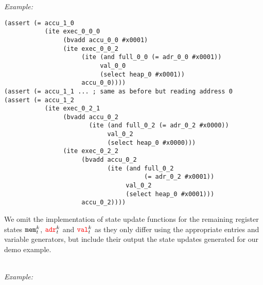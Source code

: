 \noindent
\emph{Example:} 

\begin{lstlisting}[style=smtlib]
(assert (= accu_1_0
           (ite exec_0_0_0
                (bvadd accu_0_0 #x0001)
                (ite exec_0_0_2
                     (ite (and full_0_0 (= adr_0_0 #x0001))
                          val_0_0
                          (select heap_0 #x0001))
                     accu_0_0))))
(assert (= accu_1_1 ... ; same as before but reading address 0
(assert (= accu_1_2
           (ite exec_0_2_1
                (bvadd accu_0_2
                       (ite (and full_0_2 (= adr_0_2 #x0000))
                            val_0_2
                            (select heap_0 #x0000)))
                (ite exec_0_2_2
                     (bvadd accu_0_2
                            (ite (and full_0_2
                                      (= adr_0_2 #x0001))
                                 val_0_2
                                 (select heap_0 #x0001)))
                     accu_0_2))))
\end{lstlisting}


\noindent
We omit the implementation of state update functions for the remaining register states $\texttt{mem}^k_t$, ${\color{red}\texttt{adr}}^k_t$ and ${\color{red}\texttt{val}}^k_t$ as they only differ  using the appropriate  entries and variable generators, but include their output  the state updates generated for our demo example.


~\\
\noindent
\emph{Example:} 

